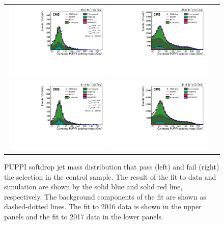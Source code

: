  \begin{figure}[h!]
 \centering
 \begin{tabular}{cc}
 \includegraphics[width=0.49\textwidth]{figures/analysis/search3/AN-17-303/vtag/newddt_2016_pass.pdf}
 \includegraphics[width=0.49\textwidth]{figures/analysis/search3/AN-17-303/vtag/newddt_2016_fail.pdf}\\
 \includegraphics[width=0.49\textwidth]{figures/analysis/search3/AN-17-303/vtag/newddt_TopPtRew_2017_pass.pdf}
 \includegraphics[width=0.49\textwidth]{figures/analysis/search3/AN-17-303/vtag/newddt_TopPtRew_2017_fail.pdf}
 \end{tabular}
 \caption{PUPPI softdrop jet mass distribution that pass (left) and fail (right) the  selection in the \ttbar control sample. The result of the fit to data and simulation are shown by the solid blue and solid red line, respectively. The background components of the fit are shown as dashed-dotted lines. The fit to 2016 data is shown in the upper panels and the fit to 2017 data in the lower panels.}
 \label{fig:simFit}
 \end{figure}
